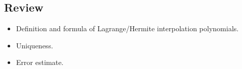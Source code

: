 \documentclass[20pt]{article} %
\theoremstyle{break}
\begin{document}










\newpage

\subsection{Review}

\begin{itemize}
\item Definition and formula of Lagrange/Hermite interpolation polynomials.
\item Uniqueness.
\item Error estimate.
\end{itemize}
\end{document}
